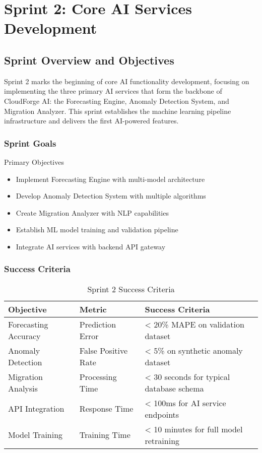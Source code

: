 \chapter{Sprint 2: Core AI Services Development}

\section{Sprint Overview and Objectives}

Sprint 2 marks the beginning of core AI functionality development, focusing on implementing the three primary AI services that form the backbone of CloudForge AI: the Forecasting Engine, Anomaly Detection System, and Migration Analyzer. This sprint establishes the machine learning pipeline infrastructure and delivers the first AI-powered features.

\subsection{Sprint Goals}

\begin{sprintbox}{Primary Objectives}
\begin{itemize}
    \item Implement Forecasting Engine with multi-model architecture
    \item Develop Anomaly Detection System with multiple algorithms
    \item Create Migration Analyzer with NLP capabilities
    \item Establish ML model training and validation pipeline
    \item Integrate AI services with backend API gateway
\end{itemize}
\end{sprintbox}

\subsection{Success Criteria}

\begin{table}[H]
\centering
\caption{Sprint 2 Success Criteria}
\begin{tabular}{|p{4cm}|p{3cm}|p{5cm}|}
\hline
\textbf{Objective} & \textbf{Metric} & \textbf{Success Criteria} \\
\hline
Forecasting Accuracy & Prediction Error & < 20\% MAPE on validation dataset \\
\hline
Anomaly Detection & False Positive Rate & < 5\% on synthetic anomaly dataset \\
\hline
Migration Analysis & Processing Time & < 30 seconds for typical database schema \\
\hline
API Integration & Response Time & < 100ms for AI service endpoints \\
\hline
Model Training & Training Time & < 10 minutes for full model retraining \\
\hline
\end{tabular}
\end{table}

